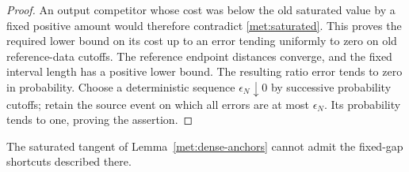 \begin{proof}
An output competitor whose cost was below the old saturated value
by a fixed positive amount would therefore contradict
\eqref{met:saturated}.  This proves the required lower bound on its
cost up to an error tending uniformly to zero on old reference-data
cutoffs.  The reference endpoint distances converge, and the fixed
interval length has a positive lower bound.  The resulting ratio
error tends to zero in probability.  Choose a deterministic sequence
$\epsilon_N\downarrow0$ by successive probability cutoffs; retain
the source event on which all errors are at most $\epsilon_N$.
Its probability tends to one, proving the assertion.
\end{proof}

\begin{lemma}
\label{met:weighted-count}
The saturated tangent of Lemma~\ref{met:dense-anchors} cannot admit
the fixed-gap shortcuts described there.
\end{lemma}

